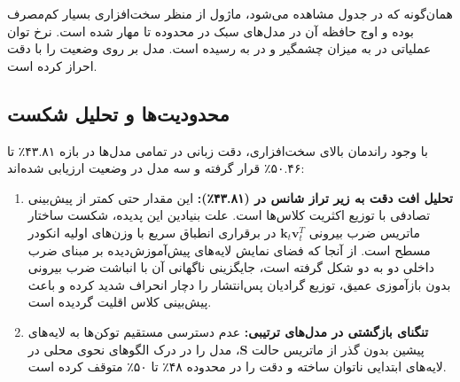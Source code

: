 همان‌گونه که در جدول مشاهده می‌شود، ماژول  از منظر سخت‌افزاری بسیار کم‌مصرف بوده و اوج حافظه آن در مدل‌های سبک در محدوده  تا  مهار شده است. نرخ توان عملیاتی در  به میزان چشمگیر  و در  به  رسیده است. مدل بر روی  وضعیت  را با دقت  احراز کرده است.

\subsection{محدودیت‌ها و تحلیل شکست}
با وجود راندمان بالای سخت‌افزاری، دقت زبانی در تمامی مدل‌ها در بازه ۴۳.۸۱٪ تا ۵۰.۴۶٪ قرار گرفته و سه مدل در وضعیت  ارزیابی شده‌اند:
\begin{enumerate}
    \item \textbf{تحلیل افت دقت به زیر تراز شانس در  (۴۳.۸۱٪):} این مقدار حتی کمتر از پیش‌بینی تصادفی با توزیع اکثریت کلاس‌ها است. علت بنیادین این پدیده، شکست ساختار ماتریس ضرب بیرونی $\mathbf{k}_t \mathbf{v}_t^T$ در برقراری انطباق سریع با وزن‌های اولیه انکودر مسطح است. از آنجا که فضای نمایش لایه‌های پیش‌آموزش‌دیده  بر مبنای ضرب داخلی دو به دو شکل گرفته است، جایگزینی ناگهانی آن با انباشت ضرب بیرونی بدون بازآموزی عمیق، توزیع گرادیان پس‌انتشار را دچار انحراف شدید کرده و باعث پیش‌بینی کلاس اقلیت گردیده است.
    \item \textbf{تنگنای بازگشتی در مدل‌های ترتیبی:} عدم دسترسی مستقیم توکن‌ها به لایه‌های پیشین بدون گذر از ماتریس حالت $\mathbf{S}$، مدل را در درک الگوهای نحوی محلی در لایه‌های ابتدایی ناتوان ساخته و دقت را در محدوده ۴۸٪ تا ۵۰٪ متوقف کرده است.
\end{enumerate}
